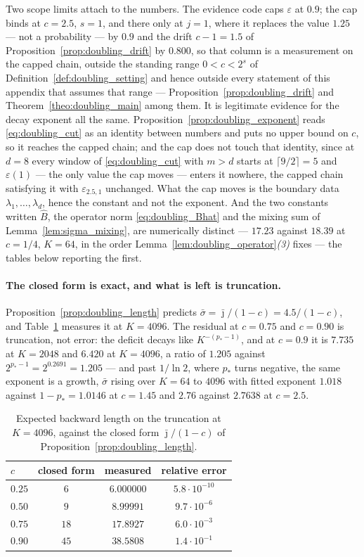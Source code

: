 Two scope limits attach to the numbers. The evidence code caps $\varepsilon$ at $0.9$; the cap
binds at $c=2.5$, $s=1$, and there only at $j=1$, where it replaces the value $1.25$ --- not a
probability --- by $0.9$ and the drift $c-1=1.5$ of Proposition~\ref{prop:doubling_drift} by
$0.800$, so that column is a measurement on the capped chain, outside the standing range
$0<c<2^s$ of Definition~\ref{def:doubling_setting} and hence outside every statement of this
appendix that assumes that range --- Proposition~\ref{prop:doubling_drift} and
Theorem~\ref{theo:doubling_main} among them. It is legitimate evidence for the decay exponent
all the same. Proposition~\ref{prop:doubling_exponent} reads \eqref{eq:doubling_cut} as an
identity between numbers and puts no upper bound on $c$, so it reaches the capped chain; and
the cap does not touch that identity, since at $d=8$ every window of \eqref{eq:doubling_cut}
with $m>d$ starts at $\lceil9/2\rceil=5$ and $\varepsilon(1)$ --- the only value the cap moves
--- enters it nowhere, the capped chain satisfying it with $\varepsilon_{2.5,1}$ unchanged.
What the cap moves is the boundary data $\lambda_1,\dots,\lambda_d$, hence the constant and
not the exponent. And the two constants written $\widehat B$, the operator norm
\eqref{eq:doubling_Bhat} and the mixing sum of Lemma~\ref{lem:sigma_mixing}, are numerically
distinct --- $17.23$ against $18.39$ at $c=1/4$, $K=64$, in the order
Lemma~\ref{lem:doubling_operator}\emph{(3)} fixes --- the tables below reporting the first.

\paragraph{The closed form is exact, and what is left is truncation.}
Proposition~\ref{prop:doubling_length} predicts $\bar\sigma=\bar\jmath/(1-c)=4.5/(1-c)$, and
Table~\ref{tab:doubling_length} measures it at $K=4096$. The residual at $c=0.75$ and $c=0.90$
is truncation, not error: the deficit decays like $K^{-(p_*-1)}$, and at $c=0.9$ it is $7.735$
at $K=2048$ and $6.420$ at $K=4096$, a ratio of $1.205$ against $2^{p_*-1}=2^{0.2691}=1.205$ ---
and past $1/\ln2$, where $p_*$ turns negative, the same exponent is a growth, $\bar\sigma$ rising
over $K=64$ to $4096$ with fitted exponent $1.018$ against $1-p_*=1.0146$ at $c=1.45$ and $2.76$
against $2.7638$ at $c=2.5$.

\begin{table}[tb]
\centering
\small
\begin{tabular}{@{}lccc@{}}
\hline
$c$ & closed form & measured & relative error \\
\hline
$0.25$ & $6$  & $6.000000$ & $5.8\cdot10^{-10}$ \\
$0.50$ & $9$  & $8.99991$  & $9.7\cdot10^{-6}$ \\
$0.75$ & $18$ & $17.8927$  & $6.0\cdot10^{-3}$ \\
$0.90$ & $45$ & $38.5808$  & $1.4\cdot10^{-1}$ \\
\hline
\end{tabular}
\caption{Expected backward length on the truncation at $K=4096$, against the closed form
$\bar\jmath/(1-c)$ of Proposition~\ref{prop:doubling_length}.}
\label{tab:doubling_length}
\end{table}

